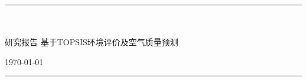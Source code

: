 \documentclass[UTF8]{ctexart}
\begin{document}
\begin{titlepage}
    \centering


    \rule{\textwidth}{1pt}   %
    \vspace{0.2\textheight}  %

    \begin{center}
		\quad \\
		\quad \\
		\heiti \fontsize{45}{17} 研究报告
		\vskip 3.5cm
		\heiti {}  基于TOPSIS环境评价及空气质量预测
	\end{center}






    

    
    \vfill  %

    {\large \today}
    \vspace{0.1\textheight}  %


    \rule{\textwidth}{1pt}  %

  \end{titlepage}
\end{document}
